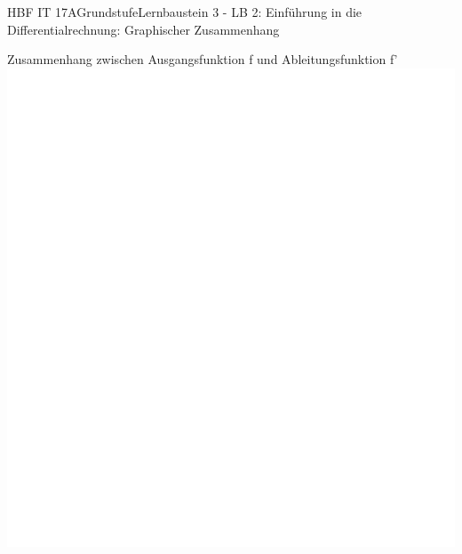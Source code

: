 \documentclass[oneside,openany,headings=optiontotoc,11pt,numbers=noenddot]{scrreprt}
\begin{document}
\begin{worksheet}{HBF IT 17A}{Grundstufe}{Lernbaustein 3 - LB 2: Einführung in die Differentialrechnung: Graphischer Zusammenhang}
		\begin{framed}
			\noindent
			\tiny{\color{codegray}Zusammenhang zwischen Ausgangsfunktion f und Ableitungsfunktion f'}\\
			\includegraphics[scale=0.39]{../empty.jpg}
		\end{framed}
	\end{worksheet}
\end{document}
